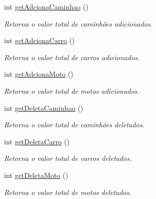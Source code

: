 \begin{DoxyCompactItemize}
int \mbox{\hyperlink{class_mundo_acc3a26a242cfe494033e8f36bad5648b}{get\+Adciona\+Caminhao}} ()
\begin{DoxyCompactList}\small\item\em Retorna o valor total de caminhões adicionados. \end{DoxyCompactList}\item 
\mbox{\label{class_mundo_ac4e9fdfe30a81bf82f1eedf4b990c96a}} 
int \mbox{\hyperlink{class_mundo_ac4e9fdfe30a81bf82f1eedf4b990c96a}{get\+Adciona\+Carro}} ()
\begin{DoxyCompactList}\small\item\em Retorna o valor total de carros adicionados. \end{DoxyCompactList}\item 
\mbox{\label{class_mundo_a7fb9d6c8df95d88eae88ed3d15f0195e}} 
int \mbox{\hyperlink{class_mundo_a7fb9d6c8df95d88eae88ed3d15f0195e}{get\+Adciona\+Moto}} ()
\begin{DoxyCompactList}\small\item\em Retorna o valor total de motos adicionados. \end{DoxyCompactList}\item 
\mbox{\label{class_mundo_ad2eb05e9209d3c30bf0514f0a24a502a}} 
int \mbox{\hyperlink{class_mundo_ad2eb05e9209d3c30bf0514f0a24a502a}{get\+Deleta\+Caminhao}} ()
\begin{DoxyCompactList}\small\item\em Retorna o valor total de caminhões deletados. \end{DoxyCompactList}\item 
\mbox{\label{class_mundo_a999bc3ec64b4daed18ab28ad6657c56c}} 
int \mbox{\hyperlink{class_mundo_a999bc3ec64b4daed18ab28ad6657c56c}{get\+Deleta\+Carro}} ()
\begin{DoxyCompactList}\small\item\em Retorna o valor total de carros deletados. \end{DoxyCompactList}\item 
\mbox{\label{class_mundo_a80d1b5b8e454f2d218c3dbfb6e344d1a}} 
int \mbox{\hyperlink{class_mundo_a80d1b5b8e454f2d218c3dbfb6e344d1a}{get\+Deleta\+Moto}} ()
\begin{DoxyCompactList}\small\item\em Retorna o valor total de motos deletados. \end{DoxyCompactList}\item 

\end{DoxyCompactItemize}
